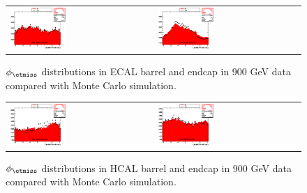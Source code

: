 \begin{figure}[h!]
 \centering
 \begin{tabular}{ll}
  \includegraphics[width=0.40\textwidth]{plots_DataVsMC_MB_900GeV/my_calometEBPhi_lin.eps} &
  \includegraphics[width=0.40\textwidth]{plots_DataVsMC_MB_900GeV/my_calometEEPhi_lin.eps} \\
 \end{tabular}
 \caption{$\phi_{\etmiss}$ distributions in ECAL barrel and endcap in 900 GeV data compared
   with Monte Carlo simulation.
          \label{fig:DataVsMC_MB_900_12}}
\end{figure}

\begin{figure}[h!]
 \centering
 \begin{tabular}{ll}
  \includegraphics[width=0.40\textwidth]{plots_DataVsMC_MB_900GeV/my_calometHBPhi_lin.eps} &
  \includegraphics[width=0.40\textwidth]{plots_DataVsMC_MB_900GeV/my_calometHEPhi_lin.eps} \\
 \end{tabular}
 \caption{$\phi_{\etmiss}$ distributions in HCAL barrel and endcap in 900 GeV data compared
   with Monte Carlo simulation.
          \label{fig:DataVsMC_MB_900_13}}
\end{figure}

